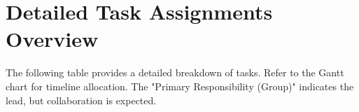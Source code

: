 \documentclass[12pt, a4paper]{article}
\begin{document}


\newpage
\section*{Detailed Task Assignments Overview}
The following table provides a detailed breakdown of tasks. Refer to the Gantt chart for timeline allocation. The "Primary Responsibility (Group)" indicates the lead, but collaboration is expected.
\end{document}
